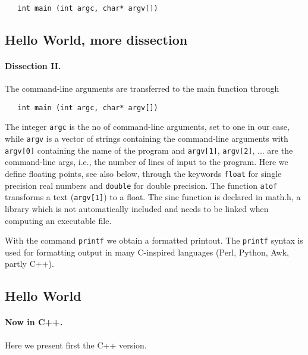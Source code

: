 \documentclass[%
oneside,                 %
final,                   %
10pt]{article}
\begin{document}
\begin{verbatim}
   int main (int argc, char* argv[])
\end{verbatim}



\subsection*{Hello World, more dissection}


\paragraph{Dissection II.}
The command-line arguments are transferred to the main function through

\begin{verbatim}
   int main (int argc, char* argv[])
\end{verbatim}
The integer \Verb!argc! is the no of command-line arguments, set to
one in our case, while
\Verb!argv! is a vector of strings containing the command-line arguments
with \Verb!argv[0]! containing  the name of the program
and \Verb!argv[1]!, \Verb!argv[2]!, ... are the command-line args, i.e., the number of
lines of input to the program.
Here we define floating points, see also below,
through the keywords \Verb!float! for single precision real numbers and
\Verb!double! for double precision. The function
\Verb!atof! transforms a text (\Verb!argv[1]!) to a float.
The sine function is declared in math.h, a library which
is not automatically included and needs to be linked when computing
an executable file.

With the command \Verb!printf! we obtain a formatted printout.
The \Verb!printf! syntax is used for formatting output
in many C-inspired languages (Perl, Python, Awk, partly C++).



\subsection*{Hello World}


\paragraph{Now in C++.}
Here we present first the C++ version.
\end{document}
